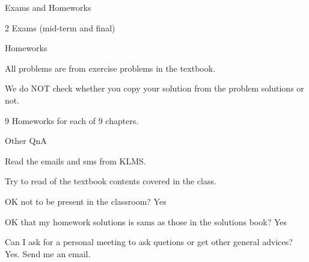 






\begin{frame}{Exams and Homeworks}

\bci

\item 2 Exams (mid-term and final)

\item<2-> Homeworks

  \bci
     \item All problems are from exercise problems in the textbook.
       \item We do NOT check whether you copy your solution from the
         problem solutions or not. 
       \eci
  


\item<3-> 9 Homeworks for each of 9 chapters.

 

  \eci

\end{frame}

\begin{frame}{Other QnA}

\bci

\item<1->Read  the emails and sms from KLMS. 

\item<1-> Try to read  of the textbook contents covered in the
  class. 

\medskip
  
\item<2-> OK not to be present in the classroom? Yes

  \item <3-> OK that my homework solutions is sams as those in the
    solutions book? Yes 

\item<3-> Can I ask for a personal meeting to ask quetions or get
  other general advices? Yes. Send me an email.
  
    \eci

\end{frame}

